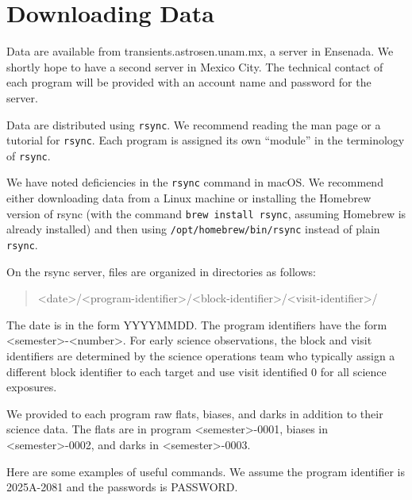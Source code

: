 \section{Downloading Data}

Data are available from transients.astrosen.unam.mx, a server in Ensenada. We shortly hope to have a second server in Mexico City. The technical contact of each program will be provided with an account name and password for the server.

Data are distributed using \verb|rsync|. We recommend reading the man page or a tutorial for \verb|rsync|. Each program is assigned its own “module” in the terminology of \verb|rsync|. 

We have noted deficiencies in the \verb|rsync| command in macOS. We recommend either downloading data from a Linux machine or installing the Homebrew version of rsync (with the command \verb|brew install rsync|, assuming Homebrew is already installed) and then using \verb|/opt/homebrew/bin/rsync| instead of plain \verb|rsync|.

On the rsync server, files are organized in directories as follows:
\begin{quote}\footnotesize
<date>/<program-identifier>/<block-identifier>/<visit-identifier>/
\end{quote}

The date is in the form YYYYMMDD. The program identifiers have the form <semester>-<number>. For early science observations, the block and visit identifiers are determined by the science operations team who typically assign a different block identifier to each target and use visit identified 0 for all science exposures.

We provided to each program raw flats, biases, and darks in addition to their science data. The flats are in program <semester>-0001, biases in <semester>-0002, and darks in <semester>-0003.

Here are some examples of useful commands. We assume the program identifier is 2025A-2081 and the passwords is PASSWORD.

